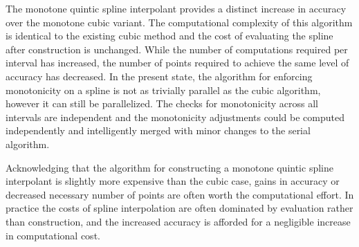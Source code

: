 
The monotone quintic spline interpolant provides a distinct increase
in accuracy over the monotone cubic variant. The computational
complexity of this algorithm is identical to the existing cubic method
and the cost of evaluating the spline after construction is
unchanged. While the number of computations required per interval has
increased, the number of points required to achieve the same level of
accuracy has decreased. In the present state, the algorithm for
enforcing monotonicity on a spline is not as trivially parallel as the
cubic algorithm, however it can still be parallelized. The checks for
monotonicity across all intervals are independent and the monotonicity
adjustments could be computed independently and intelligently merged
with minor changes to the serial algorithm.

Acknowledging that the algorithm for constructing a monotone quintic
spline interpolant is slightly more expensive than the cubic case,
gains in accuracy or decreased necessary number of points are often
worth the computational effort. In practice the costs of spline
interpolation are often dominated by evaluation rather than
construction, and the increased accuracy is afforded for a negligible
increase in computational cost.
